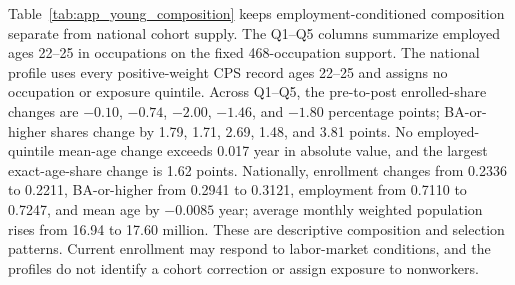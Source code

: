 Table~\ref{tab:app_young_composition} keeps employment-conditioned composition
separate from national cohort supply.  The Q1--Q5 columns summarize employed
ages 22--25 in occupations on the fixed 468-occupation support.  The national
profile uses every positive-weight CPS record ages 22--25 and assigns no
occupation or exposure quintile.  Across Q1--Q5, the pre-to-post enrolled-share
changes are $-0.10$, $-0.74$, $-2.00$, $-1.46$, and $-1.80$ percentage points;
BA-or-higher shares change by 1.79, 1.71, 2.69, 1.48, and 3.81 points.  No
employed-quintile mean-age change exceeds 0.017 year in absolute value, and the
largest exact-age-share change is 1.62 points.  Nationally, enrollment changes
from 0.2336 to 0.2211, BA-or-higher from 0.2941 to 0.3121, employment from
0.7110 to 0.7247, and mean age by $-0.0085$ year; average monthly weighted
population rises from 16.94 to 17.60 million.  These are descriptive
composition and selection patterns.  Current enrollment may respond to
labor-market conditions, and the profiles do not identify a cohort correction
or assign exposure to nonworkers.


